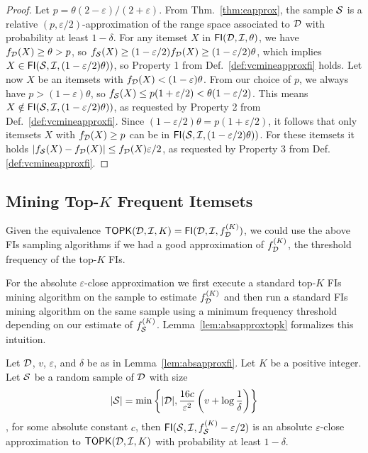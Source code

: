 \begin{proof}
  Let $p=\theta(2-\varepsilon)/(2+\varepsilon)$. From
  Thm.~\ref{thm:eapprox}, the sample ${\cal S}$ is a relative
  $(p,\varepsilon/2)$-approximation of the range space associated to ${\cal D}$ with
  probability at least $1-\delta$. For any itemset $X$ in
  $\mathsf{FI}({\cal D},{\cal I},\theta)$, we have $f_{\cal D}(X)\ge\theta>p$, so
  $f_{\cal S}(X)\ge (1-\varepsilon/2)f_{\cal D}(X)\ge(1-\varepsilon/2)\theta$, which
  implies $X\in\mathsf{FI}({\cal S},{\cal I},(1-\varepsilon/2)\theta))$, so Property 1
  from Def.~\ref{def:vcmineapproxfi} holds. Let now $X$ be an itemsets with
  $f_{\cal D}(X)< (1-\varepsilon)\theta$. From our choice of $p$, we always have
  $p>(1-\varepsilon)\theta$, so $f_{\cal S}(X)\le p(1+\varepsilon/2) <
  \theta(1-\varepsilon/2)$. This means
  $X\notin\mathsf{FI}({\cal S},{\cal I},(1-\varepsilon/2)\theta))$, as requested by
  Property 2 from Def.~\ref{def:vcmineapproxfi}. 
  Since $(1-\varepsilon/2)\theta=p(1+\varepsilon/2)$, it follows
  that only itemsets $X$ with $f_{\cal D}(X)\ge p$ can be in
  $\mathsf{FI}({\cal S},{\cal I},(1-\varepsilon/2)\theta))$. For these itemsets it holds
  $|f_{\cal S}(X)-f_{\cal D}(X)|\le f_{\cal D}(X)\varepsilon/2$, as requested by
  Property 3 from Def.\ref{def:vcmineapproxfi}.
\end{proof}

\subsection{Mining Top-$K$ Frequent Itemsets}\label{sec:vcmineminingtopk}
Given the equivalence
$\mathsf{TOPK}({\cal D},{\cal I},K)=\mathsf{FI}({\cal D},{\cal I},f^{(K)}_{\cal D})$, we could use the above
FIs sampling algorithms if we had a good approximation of $f^{(K)}_{\cal D}$, the
threshold frequency of the top-$K$ FIs.

For the absolute $\varepsilon$-close approximation we first execute a standard
top-$K$ FIs mining algorithm on the sample to estimate $f^{(K)}_{\cal D}$ and then
run a standard FIs mining algorithm on the same sample using a minimum frequency
threshold depending on our estimate of $f_{\cal S}^{(K)}$.
Lemma~\ref{lem:absapproxtopk} formalizes this intuition.

\begin{lemma}\label{lem:absapproxtopk}
  Let ${\cal D}$, $v$, $\varepsilon$, and $\delta$ be as in Lemma~\ref{lem:absapproxfi}.
  Let $K$ be a positive integer. Let ${\cal S}$ be a random sample of ${\cal D}$ with
  size
  \[
  |{\cal S}|=\min\left\{|{\cal D}|,\frac{16c}{\varepsilon^2}\left(v+\log\frac{1}{\delta}\right)\right\}\],
  for some absolute constant $c$, then $\mathsf{FI}({\cal S},{\cal I},f_{\cal S}^{(K)}-\varepsilon/2)$ is an absolute
  $\varepsilon$-close approximation to $\mathsf{TOPK}({\cal D},{\cal I},K)$ with probability at
  least $1-\delta$.
\end{lemma}

